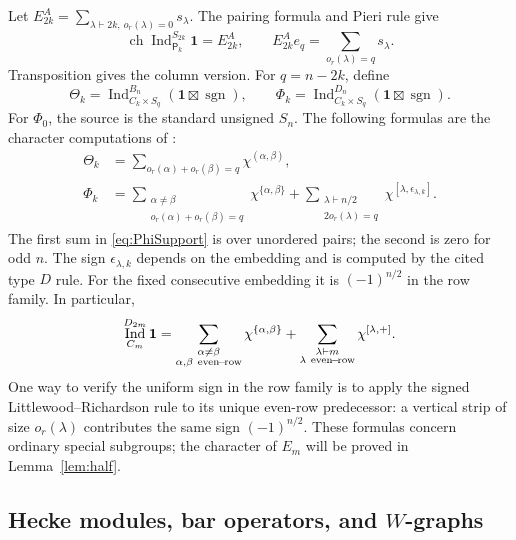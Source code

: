 \documentclass[11pt]{article}
\numberwithin{equation}{section}
\theoremstyle{definition}
\DeclareMathOperator{\Ind}{Ind}
\DeclareMathOperator{\sgn}{sgn}
\DeclareMathOperator{\ch}{ch}
\newcommand{\one}{\mathbf 1}
\newcommand{\pair}{\mathsf P}
\begin{document}
Let \(E^{A}_{2k}=\sum_{\lambda\vdash2k,\ o_r(\lambda)=0}s_\lambda\).
The pairing formula and Pieri rule give
\begin{equation}
 \ch\Ind_{\pair_k}^{S_{2k}}\one=E^{A}_{2k},\qquad
 E^{A}_{2k}e_q=\sum_{o_r(\lambda)=q}s_\lambda .
 \label{eq:Apieri}
\end{equation}
Transposition gives the column version.
For \(q=n-2k\), define
\begin{equation}
 \Theta_k=\Ind_{C_k\times S_q}^{B_n}(\one\boxtimes\sgn),\qquad
 \Phi_k=\Ind_{C_k\times S_q}^{D_n}(\one\boxtimes\sgn).
 \label{eq:ThetaPhi}
\end{equation}
For \(\Phi_0\), the source is the standard unsigned \(S_n\).
The following formulas are the character computations of \cite[Sections 4.2 and 5.3]{MZperfect}:
\begin{align}
 \Theta_k&=\sum_{o_r(\alpha)+o_r(\beta)=q}\chi^{(\alpha,\beta)},\label{eq:ThetaSupport}\\
 \Phi_k&=\sum_{\substack{\alpha\ne\beta\\o_r(\alpha)+o_r(\beta)=q}}
             \chi^{\{\alpha,\beta\}}
       +\sum_{\substack{\lambda\vdash n/2\\2o_r(\lambda)=q}}\chi^{[\lambda,\epsilon_{\lambda,k}]} .
 \label{eq:PhiSupport}
\end{align}
The first sum in \eqref{eq:PhiSupport} is over unordered pairs; the second is zero for odd \(n\).
The sign \(\epsilon_{\lambda,k}\) depends on the embedding and is computed by the cited type \(D\) rule.
For the fixed consecutive embedding it is \((-1)^{n/2}\) in the row family.
In particular,
\begin{equation}
 \Ind_{C_m}^{D_{2m}}\one
 =\sum_{\substack{\alpha\ne\beta\\\alpha,\beta\ {\rm even\!-\!row}}}
        \chi^{\{\alpha,\beta\}}
  +\sum_{\substack{\lambda\vdash m\\\lambda\ {\rm even\!-\!row}}}\chi^{[\lambda,+]} .
 \label{eq:Ctop}
\end{equation}
One way to verify the uniform sign in the row family is to apply the signed Littlewood--Richardson rule to its unique even-row predecessor: a vertical strip of size \(o_r(\lambda)\) contributes the same sign \((-1)^{n/2}\).
These formulas concern ordinary special subgroups; the character of \(E_m\) will be proved in Lemma~\ref{lem:half}.

\subsection{Hecke modules, bar operators, and \texorpdfstring{\(W\)}{W}-graphs}
\label{subsec:Heckedef}
\end{document}
